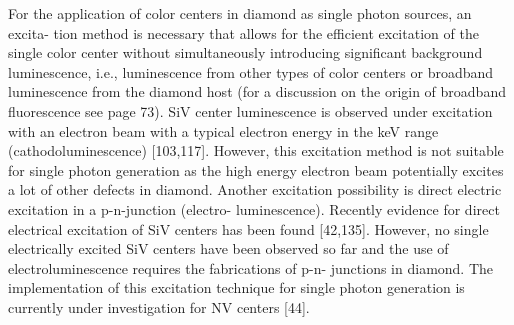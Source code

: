       For the application of color centers in diamond as single photon sources, an excita- tion method is necessary that allows for the efficient excitation of the single color center without simultaneously introducing significant background luminescence, i.e., luminescence from other types of color centers or broadband luminescence from the diamond host (for a discussion on the origin of broadband fluorescence see page 73).
      SiV center luminescence is observed under excitation with an electron beam with a typical electron energy in the keV range (cathodoluminescence) [103,117]. However, this excitation method is not suitable for single photon generation as the high energy electron beam potentially excites a lot of other defects in diamond. Another excitation possibility is direct electric excitation in a p-n-junction (electro- luminescence). Recently evidence for direct electrical excitation of SiV centers has been found [42,135]. However, no single electrically excited SiV centers have been observed so far and the use of electroluminescence requires the fabrications of p-n- junctions in diamond. The implementation of this excitation technique for single photon generation is currently under investigation for NV centers [44].

